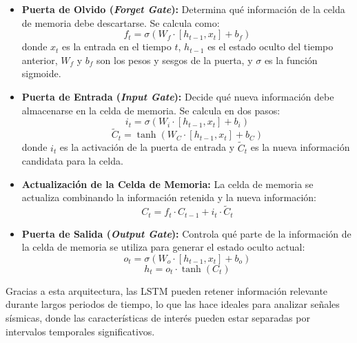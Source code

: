 \begin{itemize}
    \item \textbf{Puerta de Olvido (\textit{Forget Gate}):} Determina qué información de la celda de memoria debe descartarse. Se calcula como:
    \begin{equation}
        f_t = \sigma(W_f \cdot [h_{t-1}, x_t] + b_f)
    \end{equation}
    donde $x_t$ es la entrada en el tiempo $t$, $h_{t-1}$ es el estado oculto del tiempo anterior, $W_f$ y $b_f$ son los pesos y sesgos de la puerta, y $\sigma$ es la función sigmoide.

    \item \textbf{Puerta de Entrada (\textit{Input Gate}):} Decide qué nueva información debe almacenarse en la celda de memoria. Se calcula en dos pasos:
    \begin{equation}
        i_t = \sigma(W_i \cdot [h_{t-1}, x_t] + b_i)
    \end{equation}
    \begin{equation}
        \tilde{C}_t = \tanh(W_C \cdot [h_{t-1}, x_t] + b_C)
    \end{equation}
    donde $i_t$ es la activación de la puerta de entrada y $\tilde{C}_t$ es la nueva información candidata para la celda.

    \item \textbf{Actualización de la Celda de Memoria:} La celda de memoria se actualiza combinando la información retenida y la nueva información:
    \begin{equation}
        C_t = f_t \cdot C_{t-1} + i_t \cdot \tilde{C}_t
    \end{equation}

    \item \textbf{Puerta de Salida (\textit{Output Gate}):} Controla qué parte de la información de la celda de memoria se utiliza para generar el estado oculto actual:
    \begin{equation}
        o_t = \sigma(W_o \cdot [h_{t-1}, x_t] + b_o)
    \end{equation}
    \begin{equation}
        h_t = o_t \cdot \tanh(C_t)
    \end{equation}
\end{itemize}

Gracias a esta arquitectura, las LSTM pueden retener información relevante durante largos periodos de tiempo, lo que las hace ideales para analizar señales sísmicas, donde las características de interés pueden estar separadas por intervalos temporales significativos.

